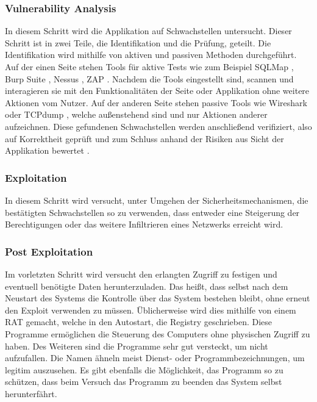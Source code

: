     \subsubsection{\glqq Vulnerability Analysis\grqq{}}
        In diesem Schritt wird die Applikation auf Schwachstellen untersucht. 
        Dieser Schritt ist in zwei Teile, die Identifikation und die Prüfung, geteilt.
        Die Identifikation wird mithilfe von aktiven und passiven Methoden durchgeführt.
        Auf der einen Seite stehen Tools für aktive Tests wie zum Beispiel 
        SQLMap \cite{damele_stampar_2014}, 
        Burp Suite \cite{LozanoCarlosA.author2019Hapt}, %
        Nessus \cite{BealeJay2008Nna}, %
        \ac{ZAP} \cite{bennetts2013owasp}. %
        Nachdem die Tools eingestellt sind, scannen und interagieren sie mit den Funktionalitäten der Seite oder Applikation ohne weitere Aktionen vom Nutzer.
        Auf der anderen Seite stehen passive Tools wie Wireshark oder TCPdump \cite{tcpdump_2010}, welche außenstehend sind und nur Aktionen anderer aufzeichnen. 
        Diese gefundenen Schwachstellen werden anschließend verifiziert, also auf Korrektheit geprüft und zum Schluss anhand der Risiken aus Sicht der Applikation bewertet \cite{hayes_2012}.
    \subsubsection{\glqq Exploitation\grqq{}} \label{Exploitation}
        In diesem Schritt wird versucht, unter Umgehen der Sicherheitsmechanismen, die bestätigten Schwachstellen so zu verwenden, dass entweder eine Steigerung der Berechtigungen oder das weitere Infiltrieren eines Netzwerks erreicht wird.
    \subsubsection{\glqq Post Exploitation\grqq{}}
        Im vorletzten Schritt wird versucht den erlangten Zugriff zu festigen und eventuell benötigte Daten herunterzuladen. Das heißt, dass selbst nach dem Neustart des Systems die Kontrolle über das System bestehen bleibt, ohne erneut den Exploit verwenden zu müssen. Üblicherweise wird dies mithilfe von einem \ac{RAT} gemacht, welche in den Autostart, die Registry geschrieben. Diese Programme ermöglichen die Steuerung des Computers ohne physischen Zugriff zu haben. Des Weiteren sind die Programme sehr gut versteckt, um nicht aufzufallen. Die Namen ähneln meist Dienst- oder Programmbezeichnungen, um legitim auszusehen. Es gibt ebenfalls die Möglichkeit, das Programm so zu schützen, dass beim Versuch das Programm zu beenden das System selbst herunterfährt.
